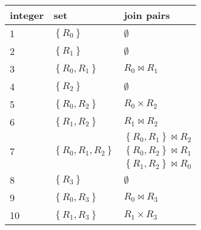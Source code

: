 \documentclass[12pt]{scrartcl}
\begin{document}
\begin{enumerate}
	\begin{table}[H]
		\begin{center}
			\begin{tabular}{lll}
				\hline
				integer &set & join pairs \\ \hline 
				1	&$\left\lbrace R_{0}\right\rbrace $	& $\emptyset$ \\ \hline
				2	&$\left\lbrace R_{1}\right\rbrace $	& $\emptyset$ \\ \hline
				3	&$\left\lbrace R_{0}, R_{1}\right\rbrace $     & $R_{0} \bowtie R_{1}$            \\ \hline
				4	&$\left\lbrace R_{2}\right\rbrace $	& $\emptyset$ \\ \hline
				5	&$\left\lbrace R_{0}, R_{2}\right\rbrace $     & $R_{0} \times R_{2}$				\\\hline
				6	&$\left\lbrace R_{1}, R_{2}\right\rbrace $     & $R_{1} \bowtie R_{2}$				\\ \hline 
				\multirow{3}{*}{7}	&\multirow{3}{*}{$\left\lbrace R_{0}, R_{1}, R_{2}\right\rbrace$}	& $\left\lbrace R_{0}, R_{1}\right\rbrace \bowtie R_{2}$ \\
				&																	& $\left\lbrace R_{0}, R_{2}\right\rbrace \bowtie R_{1}$ \\ 
				&																	& $\left\lbrace R_{1}, R_{2}\right\rbrace \bowtie R_{0}$ \\ \hline
				8	&$\left\lbrace R_{3}\right\rbrace $	&$\emptyset$	\\ \hline
				9	&$\left\lbrace R_{0}, R_{3}\right\rbrace $     & $R_{0} \bowtie R_{3}$				\\ \hline
				10	&$\left\lbrace R_{1}, R_{3}\right\rbrace $     & $R_{1} \times R_{3}$				\\ \hline
			\end{tabular}
		\end{center}
	\end{table}
	

\end{enumerate}
\end{document}
